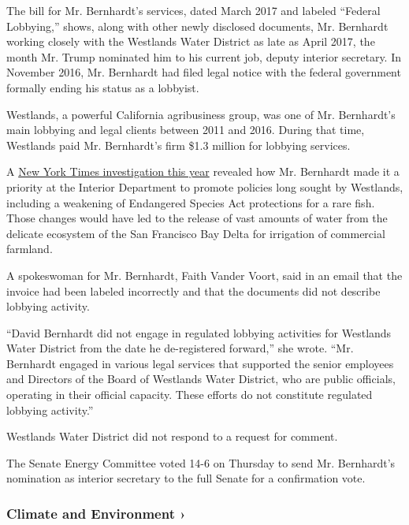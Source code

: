 The bill for Mr. Bernhardt's services, dated March 2017 and labeled
``Federal Lobbying,'' shows, along with other newly disclosed documents,
Mr. Bernhardt working closely with the Westlands Water District as late
as April 2017, the month Mr. Trump nominated him to his current job,
deputy interior secretary. In November 2016, Mr. Bernhardt had filed
legal notice with the federal government formally ending his status as a
lobbyist.

Westlands, a powerful California agribusiness group, was one of Mr.
Bernhardt's main lobbying and legal clients between 2011 and 2016.
During that time, Westlands paid Mr. Bernhardt's firm \$1.3 million for
lobbying services.

A
\href{https://www.nytimes.com/2019/02/12/climate/david-bernhardt-endangered-species.html}{New
York Times investigation this year} revealed how Mr. Bernhardt made it a
priority at the Interior Department to promote policies long sought by
Westlands, including a weakening of Endangered Species Act protections
for a rare fish. Those changes would have led to the release of vast
amounts of water from the delicate ecosystem of the San Francisco Bay
Delta for irrigation of commercial farmland.

A spokeswoman for Mr. Bernhardt, Faith Vander Voort, said in an email
that the invoice had been labeled incorrectly and that the documents did
not describe lobbying activity.

``David Bernhardt did not engage in regulated lobbying activities for
Westlands Water District from the date he de-registered forward,'' she
wrote. ``Mr. Bernhardt engaged in various legal services that supported
the senior employees and Directors of the Board of Westlands Water
District, who are public officials, operating in their official
capacity. These efforts do not constitute regulated lobbying activity.''

Westlands Water District did not respond to a request for comment.

The Senate Energy Committee voted 14-6 on Thursday to send Mr.
Bernhardt's nomination as interior secretary to the full Senate for a
confirmation vote.

\href{https://www.nytimes.com/section/climate?action=click\&pgtype=Article\&state=default\&region=MAIN_CONTENT_1\&context=storylines_keepup}{}

\hypertarget{climate-and-environment-}{%
\subsubsection{Climate and Environment
›}\label{climate-and-environment-}}

